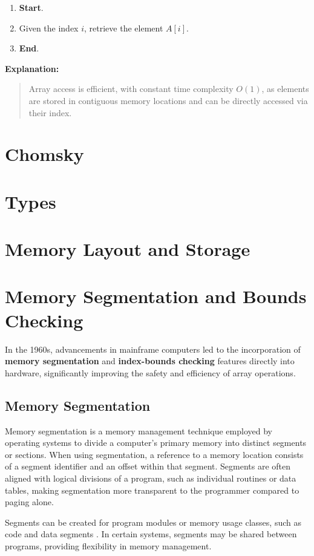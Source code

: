 \documentclass[12pt, oneside]{book}
\begin{document}
\begin{enumerate}
	\item \textbf{Start}.
	\item Given the index $i$, retrieve the element $A[i]$.
	\item \textbf{End}.
\end{enumerate}

\textbf{Explanation:}
\begin{quote}
	Array access is efficient, with constant time complexity $O(1)$, as elements are stored in contiguous memory locations and can be directly accessed via their index.
\end{quote}

\section{Chomsky}

\section{Types}
\section{Memory Layout and Storage}
\section{Memory Segmentation and Bounds Checking}

In the 1960s, advancements in mainframe computers led to the incorporation of \textbf{memory segmentation} and \textbf{index-bounds checking} features directly into hardware, significantly improving the safety and efficiency of array operations.

\subsection{Memory Segmentation}
Memory segmentation is a memory management technique employed by operating systems to divide a computer's primary memory into distinct segments or sections. When using segmentation, a reference to a memory location consists of a segment identifier and an offset within that segment. Segments are often aligned with logical divisions of a program, such as individual routines or data tables, making segmentation more transparent to the programmer compared to paging alone. 

Segments can be created for program modules or memory usage classes, such as code and data segments . In certain systems, segments may be shared between programs, providing flexibility in memory management.
\end{document}

